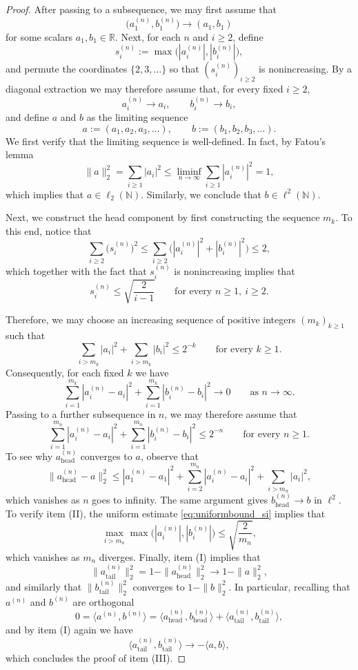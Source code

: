 \documentclass[11pt]{amsart}
\newcommand{\R}{\mathbb R}
\begin{document}
\begin{proof}
After passing to a subsequence, we may first assume that
\[
\bigl(a_1^{(n)},b_1^{(n)}\bigr) \longrightarrow (a_1,b_1)
\]
for some scalars $a_1,b_1 \in \R$. Next, for each $n$ and $i \ge 2$, define
\[
s_i^{(n)} := \max\bigl( |a_i^{(n)}|, |b_i^{(n)}| \bigr),
\]
and permute the coordinates $\{2,3,\dots\}$ so that $(s_i^{(n)})_{i \ge 2}$ is
nonincreasing. By a diagonal extraction we may therefore assume that, for every fixed
$i \ge 2$,
\[
a_i^{(n)} \longrightarrow a_i,
\qquad
b_i^{(n)} \longrightarrow b_i,
\]
and define $a$ and $b$ as the limiting sequence
\[
a := (a_1,a_2,a_3,\dots),
\qquad
b := (b_1,b_2,b_3,\dots).
\]
We first verify that the limiting sequence is well-defined. In fact, by Fatou's lemma
\[
\|a\|_2^2=\sum_{i \ge 1} |a_i|^2
\le
\liminf_{n \to \infty} \sum_{i \ge 1} |a_i^{(n)}|^2
= 1,
\]
which implies that $a\in \ell_2(\mathbb{N})$. Similarly, we conclude that $b\in \ell^2(\mathbb{N})$.

Next, we construct the head component by first constructing the sequence $m_k$. To this end, notice that
\[
\sum_{i \ge 2} \bigl(s_i^{(n)}\bigr)^2
\le
\sum_{i \ge 2} \bigl( |a_i^{(n)}|^2 + |b_i^{(n)}|^2 \bigr)
\le 2,
\]
which together with the fact that $s_i^{(n)}$ is nonincreasing implies that 
\begin{equation}
\label{eq:uniformbound_si}
s_i^{(n)} \le \sqrt{\frac{2}{i-1}}
\qquad
\text{for every } n \ge 1,\ i \ge 2.
\end{equation}


Therefore, we may choose an increasing sequence of positive integers $(m_k)_{k \ge 1}$ such that
\[
\sum_{i > m_k} |a_i|^2 + \sum_{i > m_k} |b_i|^2 \le 2^{-k}
\qquad
\text{for every } k \ge 1.
\]
Consequently, for each fixed $k$ we have
\[
\sum_{i=1}^{m_k} |a_i^{(n)}-a_i|^2
+ \sum_{i=1}^{m_k} |b_i^{(n)}-b_i|^2
\longrightarrow 0
\qquad
\text{as } n \to \infty.
\]
Passing to a further subsequence in $n$, we may therefore assume that
\[
\sum_{i=1}^{m_n} |a_i^{(n)}-a_i|^2
+ \sum_{i=1}^{m_n} |b_i^{(n)}-b_i|^2
\le 2^{-n}
\qquad
\text{for every } n \ge 1.
\]
To see why $a^{(n)}_{\mathrm{head}}$ converges to $a$, observe that
\[
\|a^{(n)}_{\mathrm{head}}-a\|_2^2
\le
|a_1^{(n)}-a_1|^2
+ \sum_{i=2}^{m_n} |a_i^{(n)}-a_i|^2 + \sum_{i > m_n} |a_i|^2,
\]
which vanishes as $n$ goes to infinity. The same argument gives
$b^{(n)}_{\mathrm{head}} \to b$ in $\ell^2$. To verify item (II), the uniform estimate \eqref{eq:uniformbound_si} implies that
\[
\max_{i > m_n} \max\bigl( |a_i^{(n)}|, |b_i^{(n)}| \bigr)
\le
\sqrt{\frac{2}{m_n}},
\]
which vanishes as $m_n$ diverges. Finally, item (I) implies that
\[
\|a^{(n)}_{\mathrm{tail}}\|_2^2
=
1-\|a^{(n)}_{\mathrm{head}}\|_2^2
\longrightarrow
1-\|a\|_2^2,
\]
and similarly that $\|b^{(n)}_{\mathrm{tail}}\|_2^2$ converges to $1-\|b\|_2^2$. In particular, recalling that $a^{(n)}$ and $b^{(n)}$ are orthogonal
\[
0 = \langle a^{(n)}, b^{(n)} \rangle
=
\langle a^{(n)}_{\mathrm{head}}, b^{(n)}_{\mathrm{head}} \rangle
+
\langle a^{(n)}_{\mathrm{tail}}, b^{(n)}_{\mathrm{tail}} \rangle,
\]
and by item (I) again we have
\[
\langle a^{(n)}_{\mathrm{tail}}, b^{(n)}_{\mathrm{tail}} \rangle
\longrightarrow
- \langle a,b \rangle,
\]
which concludes the proof of item (III).
\end{proof}
\end{document}
